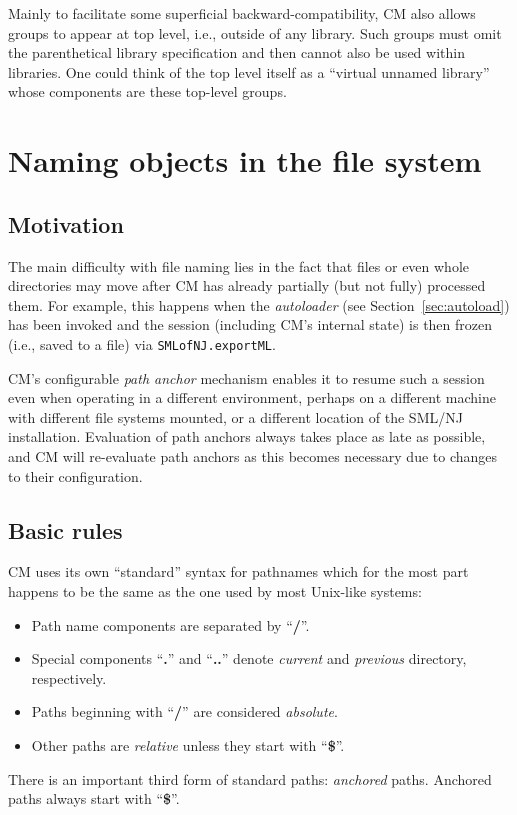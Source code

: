 \documentclass[titlepage,letterpaper]{article}
\begin{document}
Mainly to facilitate some superficial backward-compatibility, CM also
allows groups to appear at top level, i.e., outside of any library.
Such groups must omit the parenthetical library specification and then
cannot also be used within libraries. One could think of the top level
itself as a ``virtual unnamed library'' whose components are these
top-level groups.

\section{Naming objects in the file system}

\subsection{Motivation}

The main difficulty with file naming lies in the fact that files or
even whole directories may move after CM has already partially (but
not fully) processed them.  For example, this happens when the {\em
autoloader} (see Section~\ref{sec:autoload}) has been invoked and the
session (including CM's internal state) is then frozen (i.e., saved to
a file) via {\tt SMLofNJ.exportML}.

CM's configurable {\em path anchor} mechanism enables it to resume
such a session even when operating in a different environment, perhaps
on a different machine with different file systems mounted, or a
different location of the SML/NJ installation.  Evaluation of path
anchors always takes place as late as possible, and CM will re-evaluate
path anchors as this becomes necessary due to changes to their
configuration.

\subsection{Basic rules}
\label{sec:basicrules}

CM uses its own ``standard'' syntax for pathnames which for the most
part happens to be the same as the one used by most Unix-like systems:
\begin{itemize}
\item Path name components are separated by ``{\bf /}''.
\item Special components ``{\bf .}'' and ``{\bf ..}'' denote {\em
current} and {\em previous} directory, respectively.
\item Paths beginning
with ``{\bf /}'' are considered {\em absolute}.
\item Other paths are {\em relative} unless they start with ``{\bf \$}''.
\end{itemize}
\noindent There is an important third form of standard paths: {\em
anchored} paths.  Anchored paths always start with ``{\bf \$}''.
\end{document}
